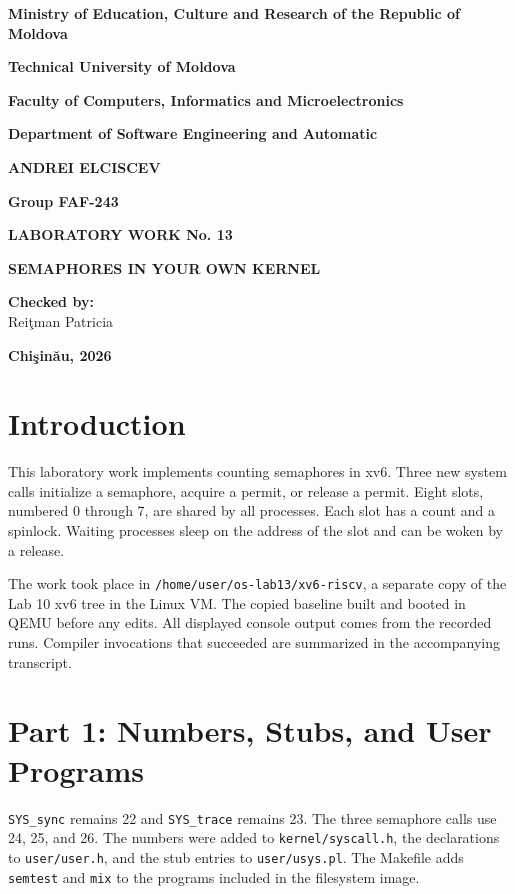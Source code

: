 \documentclass[12pt,a4paper]{article}
\begin{document}
\begin{titlepage}
\centering
\textbf{Ministry of Education, Culture and Research of the Republic of Moldova}\par\medskip
\textbf{Technical University of Moldova}\par\medskip
\textbf{Faculty of Computers, Informatics and Microelectronics}\par\medskip
\textbf{Department of Software Engineering and Automatic}\par
\vspace{2.5cm}
\textbf{ANDREI ELCISCEV}\par
\textbf{Group FAF-243}\par
\vspace{2cm}
{\Large\textbf{LABORATORY WORK No. 13}\par}
\medskip
{\Large\textbf{SEMAPHORES IN YOUR OWN KERNEL}\par}
\vspace{2cm}
\begin{flushright}
\textbf{Checked by:}\\
Rei\c{t}man Patricia
\end{flushright}
\vfill
\textbf{Chi\c{s}in\u{a}u, 2026}
\end{titlepage}
\tableofcontents
\newpage
\section{Introduction}
This laboratory work implements counting semaphores in xv6. Three new system calls
initialize a semaphore, acquire a permit, or release a permit. Eight slots, numbered
0 through 7, are shared by all processes. Each slot has a count and a spinlock.
Waiting processes sleep on the address of the slot and can be woken by a release.

The work took place in \texttt{/home/user/os-lab13/xv6-riscv}, a separate copy of
the Lab 10 xv6 tree in the Linux VM. The copied baseline built and booted in QEMU
before any edits. All displayed console output comes from the recorded runs.
Compiler invocations that succeeded are summarized in the accompanying transcript.

\section{Part 1: Numbers, Stubs, and User Programs}
\texttt{SYS\_sync} remains 22 and \texttt{SYS\_trace} remains 23. The three semaphore
calls use 24, 25, and 26. The numbers were added to \texttt{kernel/syscall.h},
the declarations to \texttt{user/user.h}, and the stub entries to
\texttt{user/usys.pl}. The Makefile adds \texttt{semtest} and \texttt{mix}
to the programs included in the filesystem image.
\end{document}
